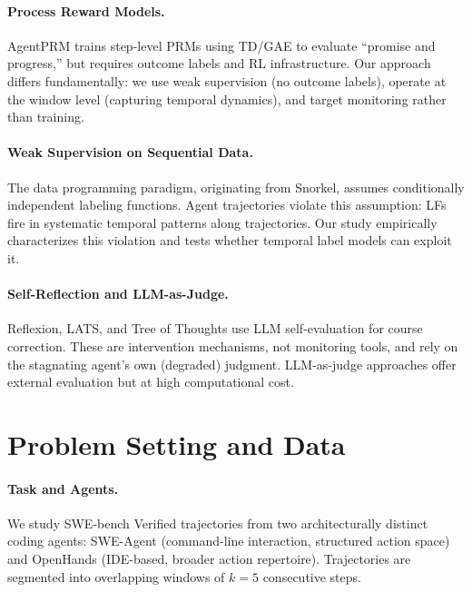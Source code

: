 \documentclass[11pt]{article}
\begin{document}
\paragraph{Process Reward Models.}
AgentPRM trains step-level PRMs using TD/GAE to evaluate ``promise and progress,'' but requires outcome labels and RL infrastructure. Our approach differs fundamentally: we use weak supervision (no outcome labels), operate at the window level (capturing temporal dynamics), and target monitoring rather than training.

\paragraph{Weak Supervision on Sequential Data.}
The data programming paradigm, originating from Snorkel, assumes conditionally independent labeling functions. Agent trajectories violate this assumption: LFs fire in systematic temporal patterns along trajectories. Our study empirically characterizes this violation and tests whether temporal label models can exploit it.

\paragraph{Self-Reflection and LLM-as-Judge.}
Reflexion, LATS, and Tree of Thoughts use LLM self-evaluation for course correction. These are intervention mechanisms, not monitoring tools, and rely on the stagnating agent's own (degraded) judgment. LLM-as-judge approaches offer external evaluation but at high computational cost.

\section{Problem Setting and Data}
\label{sec:data}

\paragraph{Task and Agents.}
We study SWE-bench Verified trajectories from two architecturally distinct coding agents: SWE-Agent (command-line interaction, structured action space) and OpenHands (IDE-based, broader action repertoire). Trajectories are segmented into overlapping windows of $k\!=\!5$ consecutive steps.
\end{document}
